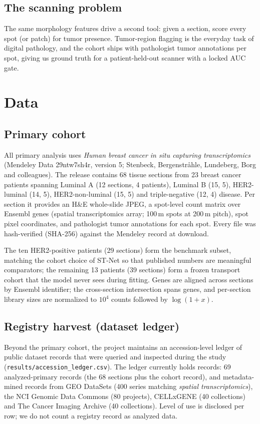 \documentclass[11pt]{article}
\begin{document}
\subsection{The scanning problem}
The same morphology features drive a second tool: given a section, score every spot
(or patch) for tumor presence. Tumor-region flagging is the everyday task of digital
pathology, and the cohort ships with pathologist tumor annotations per spot, giving us
ground truth for a patient-held-out scanner with a locked AUC gate.

\section{Data}
\subsection{Primary cohort}
All primary analysis uses \emph{Human breast cancer in situ capturing
transcriptomics} (Mendeley Data 29ntw7sh4r, version 5; Stenbeck, Bergenstr\r{a}hle,
Lundeberg, Borg and colleagues). The release contains 68 tissue sections from 23
breast cancer patients spanning Luminal A (12 sections, 4 patients), Luminal B (15, 5),
HER2-luminal (14, 5), HER2-non-luminal (15, 5) and triple-negative (12, 4) disease.
Per section it provides an H\&E whole-slide JPEG, a spot-level count matrix over
Ensembl genes (spatial transcriptomics array; 100\,\textmu m spots at 200\,\textmu m
pitch), spot pixel coordinates, and pathologist tumor annotations for each spot.
Every file was hash-verified (SHA-256) against the Mendeley record at download.

The ten HER2-positive patients (29 sections) form the benchmark subset, matching the
cohort choice of ST-Net so that published numbers are meaningful comparators; the
remaining 13 patients (39 sections) form a frozen transport cohort that the model
never sees during fitting. Genes are aligned across sections by Ensembl identifier;
the cross-section intersection spans \numUniverse{} genes, and per-section library
sizes are normalized to $10^4$ counts followed by $\log(1+x)$.

\subsection{Registry harvest (dataset ledger)}
Beyond the primary cohort, the project maintains an accession-level ledger of public
dataset records that were queried and inspected during the study
(\texttt{results/accession\_ledger.csv}). The ledger currently holds \numDatasets{}
records: 69 analyzed-primary records (the 68 sections plus the cohort record), and
metadata-mined records from GEO DataSets (400 series matching \emph{spatial
transcriptomics}), the NCI Genomic Data Commons (80 projects), CELLxGENE (40
collections) and The Cancer Imaging Archive (40 collections). Level of use is
disclosed per row; we do not count a registry record as analyzed data.
\end{document}

